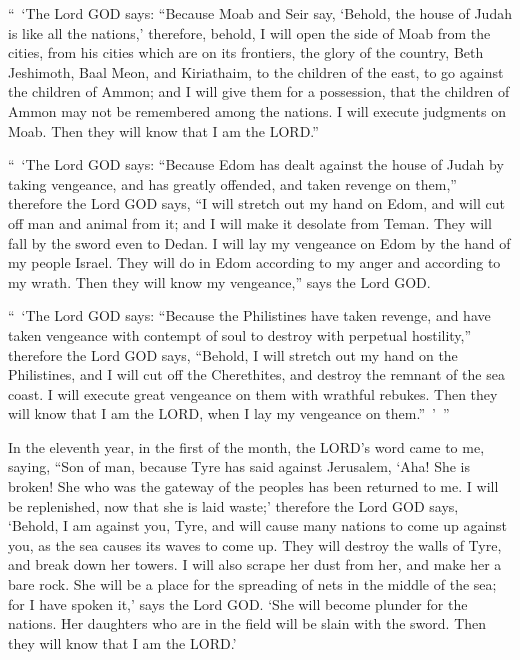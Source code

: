 \myverse{}“ ‘The Lord GOD says: “Because Moab and Seir say, ‘Behold, the
house of Judah is like all the nations,’
\myverse{}therefore, behold, I will open the side of Moab from the cities, from his cities
which are on its frontiers, the glory of the country, Beth Jeshimoth, Baal Meon, and Kiriathaim,
\myverse{}to the children of the east, to go against the children of Ammon; and I will
give them for a possession, that the children of Ammon may not be remembered among the nations.
\myverse{}I will execute judgments on Moab. Then they will know that I am the LORD.”

\myverse{}“ ‘The Lord GOD says: “Because Edom has dealt against the house
of Judah by taking vengeance, and has greatly offended, and taken revenge on them,”
\myverse{}therefore the Lord GOD says, “I will stretch out my hand on Edom, and will
cut off man and animal from it; and I will make it desolate from Teman. They will fall by the sword even
to Dedan.
\myverse{}I will lay my vengeance on Edom by the hand of my people Israel. They will
do in Edom according to my anger and according to my wrath. Then they will know my vengeance,” says the
Lord GOD.

\myverse{}“ ‘The Lord GOD says: “Because the Philistines have taken revenge,
and have taken vengeance with contempt of soul to destroy with perpetual hostility,”
\myverse{}therefore the Lord GOD says, “Behold, I will stretch out my hand on the Philistines,
and I will cut off the Cherethites, and destroy the remnant of the sea coast.
\myverse{}I will execute great vengeance on them with wrathful rebukes. Then they will
know that I am the LORD, when I lay my vengeance on them.” ’ ”


\mychapter{} \myverse*{}In the eleventh year, in the first of the month, the LORD’s word
came to me, saying,
\myverse{}“Son of man, because Tyre has said against Jerusalem, ‘Aha! She is broken!
She who was the gateway of the peoples has been returned to me. I will be replenished, now that she is
laid waste;’
\myverse{}therefore the Lord GOD says, ‘Behold, I am against you, Tyre, and will cause
many nations to come up against you, as the sea causes its waves to come up.
\myverse{}They will destroy the walls of Tyre, and break down her towers. I will also
scrape her dust from her, and make her a bare rock.
\myverse{}She will be a place for the spreading of nets in the middle of the sea; for
I have spoken it,’ says the Lord GOD. ‘She will become plunder for the nations.
\myverse{}Her daughters who are in the field will be slain with the sword. Then they
will know that I am the LORD.’

